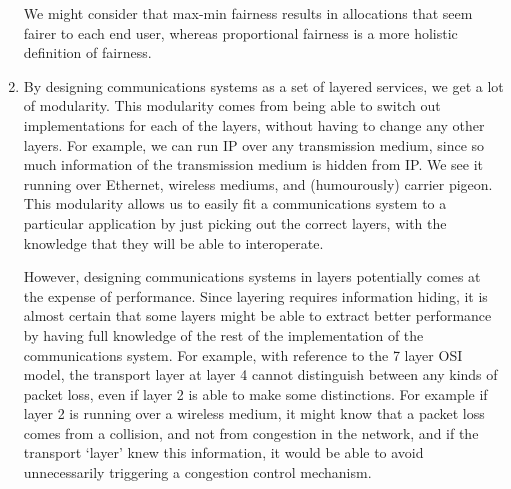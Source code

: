 \begin{enumerate}[label=(\alph*)]
    We might consider that max-min fairness results in allocations that seem fairer to each end user, whereas proportional fairness is a more holistic definition of fairness.

  \item
    By designing communications systems as a set of layered services, we get a lot of modularity. This modularity comes from being able to switch out implementations for each of the layers, without having to change any other layers. For example, we can run IP over any transmission medium, since so much information of the transmission medium is hidden from IP. We see it running over Ethernet, wireless mediums, and (humourously) carrier pigeon. This modularity allows us to easily fit a communications system to a particular application by just picking out the correct layers, with the knowledge that they will be able to interoperate.

    However, designing communications systems in layers potentially comes at the expense of performance. Since layering requires information hiding, it is almost certain that some layers might be able to extract better performance by having full knowledge of the rest of the implementation of the communications system. For example, with reference to the 7 layer OSI model, the transport layer at layer 4 cannot distinguish between any kinds of packet loss, even if layer 2 is able to make some distinctions. For example if layer 2 is running over a wireless medium, it might know that a packet loss comes from a collision, and not from congestion in the network, and if the transport `layer' knew this information, it would be able to avoid unnecessarily triggering a congestion control mechanism.
        
\end{enumerate}

